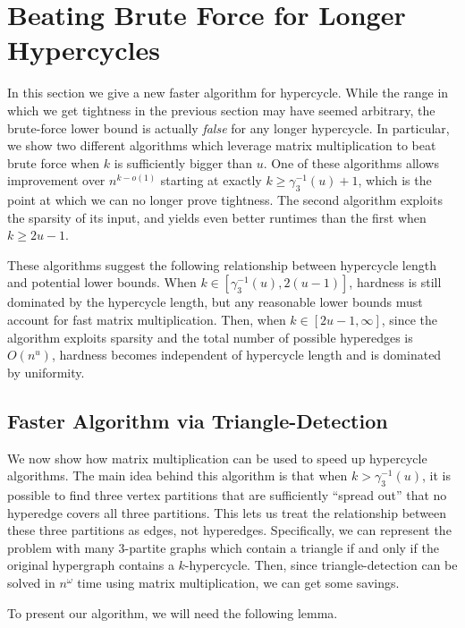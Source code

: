 \documentclass[11pt,letterpaper,pdftex]{article}
\begin{document}
\section{Beating Brute Force for Longer Hypercycles}
\label{sec:ub_unweighted}

In this section we give a new faster algorithm for hypercycle. 
While the range in which we get tightness in the previous section may have seemed arbitrary, the brute-force lower bound is actually \textit{false} for any longer hypercycle.
In particular, we show two different algorithms which leverage matrix multiplication to beat brute force when $k$ is sufficiently bigger than $u$.
One of these algorithms allows improvement over $n^{k-o(1)}$ starting at exactly $k \geq \gamma_3^{-1}(u)+1$, which is the point at which we can no longer prove tightness. 
The second algorithm exploits the sparsity of its input, and yields even better runtimes than the first when $k \geq 2u-1$.

These algorithms suggest the following relationship between hypercycle length and potential lower bounds.
When $k \in [\gamma_3^{-1}(u),2(u-1)]$, hardness is still dominated by the hypercycle length, but any reasonable lower bounds must account for fast matrix multiplication.
Then, when $k \in [2u-1, \infty]$, since the algorithm exploits sparsity and the total number of possible hyperedges is $O(n^u)$, hardness becomes independent of hypercycle length and is dominated by uniformity. 

\subsection{Faster Algorithm via Triangle-Detection} \label{subsec:triangle_detection}

We now show how matrix multiplication can be used to speed up hypercycle algorithms.
The main idea behind this algorithm is that when $k>\gamma_3^{-1}(u)$, it is possible to find three vertex partitions that are sufficiently ``spread out'' that no hyperedge covers all three partitions. This lets us treat the relationship between these three partitions as edges, not hyperedges. Specifically, we can represent the problem with many $3$-partite graphs which contain a triangle if and only if the original hypergraph contains a $k$-hypercycle. 
Then, since triangle-detection can be solved in $n^\omega$ time using matrix multiplication, we can get some savings.

To present our algorithm, we will need the following lemma.
\end{document}
